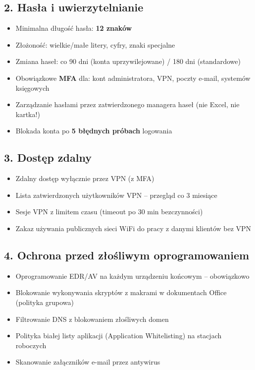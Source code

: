 \documentclass[12pt,a4paper]{article}
\providecommand{\tightlist}{\setlength{\itemsep}{0pt}\setlength{\parskip}{0pt}}
\begin{document}
\subsection{2. Hasła i
uwierzytelnianie}\label{hasux142a-i-uwierzytelnianie}

\begin{itemize}
\tightlist
\item
  Minimalna długość hasła: \textbf{12 znaków}
\item
  Złożoność: wielkie/małe litery, cyfry, znaki specjalne
\item
  Zmiana haseł: co 90 dni (konta uprzywilejowane) / 180 dni
  (standardowe)
\item
  Obowiązkowe \textbf{MFA} dla: kont administratora, VPN, poczty e-mail,
  systemów księgowych
\item
  Zarządzanie hasłami przez zatwierdzonego managera haseł (nie Excel,
  nie kartka!)
\item
  Blokada konta po \textbf{5 błędnych próbach} logowania
\end{itemize}

\subsection{3. Dostęp zdalny}\label{dostux119p-zdalny}

\begin{itemize}
\tightlist
\item
  Zdalny dostęp wyłącznie przez VPN (z MFA)
\item
  Lista zatwierdzonych użytkowników VPN -- przegląd co 3 miesiące
\item
  Sesje VPN z limitem czasu (timeout po 30 min bezczynności)
\item
  Zakaz używania publicznych sieci WiFi do pracy z danymi klientów bez
  VPN
\end{itemize}

\subsection{4. Ochrona przed złośliwym
oprogramowaniem}\label{ochrona-przed-zux142oux15bliwym-oprogramowaniem}

\begin{itemize}
\tightlist
\item
  Oprogramowanie EDR/AV na każdym urządzeniu końcowym -- obowiązkowo
\item
  Blokowanie wykonywania skryptów z makrami w dokumentach Office
  (polityka grupowa)
\item
  Filtrowanie DNS z blokowaniem złośliwych domen
\item
  Polityka białej listy aplikacji (Application Whitelisting) na stacjach
  roboczych
\item
  Skanowanie załączników e-mail przez antywirus
\end{itemize}
\end{document}
